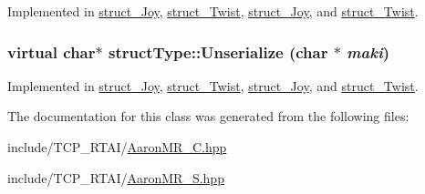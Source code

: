 Implemented in \hyperlink{classstruct__Joy_af683ec9dbedf3372b8ed17bff8c8b846}{struct\_\-Joy}, \hyperlink{classstruct__Twist_a0531691876c9cbabb1932cb54592c956}{struct\_\-Twist}, \hyperlink{classstruct__Joy_a6ad749ee0383dde28696e7aeeb050d09}{struct\_\-Joy}, and \hyperlink{classstruct__Twist_a69b1008d4218c372a14b7ce1e8d6d485}{struct\_\-Twist}.

\hypertarget{classstructType_ac89681a3336b2fc76e65435238241db2}{
\subsubsection[{Unserialize}]{\setlength{\rightskip}{0pt plus 5cm}virtual char$\ast$ structType::Unserialize (char $\ast$ {\em maki})}}
\label{classstructType_ac89681a3336b2fc76e65435238241db2}


Implemented in \hyperlink{classstruct__Joy_af683ec9dbedf3372b8ed17bff8c8b846}{struct\_\-Joy}, \hyperlink{classstruct__Twist_a0531691876c9cbabb1932cb54592c956}{struct\_\-Twist}, \hyperlink{classstruct__Joy_a6ad749ee0383dde28696e7aeeb050d09}{struct\_\-Joy}, and \hyperlink{classstruct__Twist_a69b1008d4218c372a14b7ce1e8d6d485}{struct\_\-Twist}.



The documentation for this class was generated from the following files:\begin{DoxyCompactItemize}
\item 
include/TCP\_\-RTAI/\hyperlink{AaronMR__C_8hpp}{AaronMR\_\-C.hpp}\item 
include/TCP\_\-RTAI/\hyperlink{AaronMR__S_8hpp}{AaronMR\_\-S.hpp}\end{DoxyCompactItemize}
